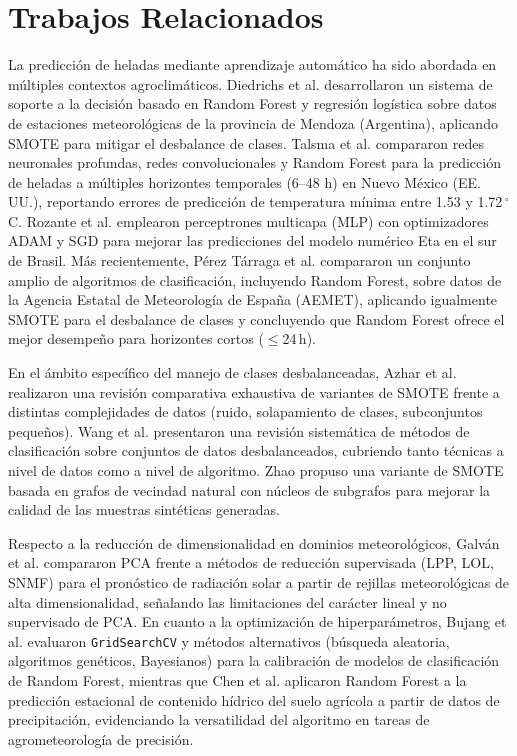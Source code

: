\section{Trabajos Relacionados}\label{sec:relwork}
 
La predicción de heladas mediante aprendizaje automático ha sido abordada en múltiples contextos agroclimáticos. Diedrichs et al. \cite{diedrichs2018} desarrollaron un sistema de soporte a la decisión basado en Random Forest y regresión logística sobre datos de estaciones meteorológicas de la provincia de Mendoza (Argentina), aplicando SMOTE para mitigar el desbalance de clases. Talsma et al. \cite{talsma2023} compararon redes neuronales profundas, redes convolucionales y Random Forest para la predicción de heladas a múltiples horizontes temporales (6--48 h) en Nuevo México (EE.\,UU.), reportando errores de predicción de temperatura mínima entre 1.53 y 1.72\,$^{\circ}$C. Rozante et al. \cite{rozante2023} emplearon perceptrones multicapa (MLP) con optimizadores ADAM y SGD para mejorar las predicciones del modelo numérico Eta en el sur de Brasil. Más recientemente, Pérez Tárraga et al. \cite{perez2025} compararon un conjunto amplio de algoritmos de clasificación, incluyendo Random Forest, sobre datos de la Agencia Estatal de Meteorología de España (AEMET), aplicando igualmente SMOTE para el desbalance de clases y concluyendo que Random Forest ofrece el mejor desempeño para horizontes cortos ($\leq$24\,h).
 
En el ámbito específico del manejo de clases desbalanceadas, Azhar et al. \cite{azhar2023} realizaron una revisión comparativa exhaustiva de variantes de SMOTE frente a distintas complejidades de datos (ruido, solapamiento de clases, subconjuntos pequeños). Wang et al. \cite{wang2021} presentaron una revisión sistemática de métodos de clasificación sobre conjuntos de datos desbalanceados, cubriendo tanto técnicas a nivel de datos como a nivel de algoritmo. Zhao \cite{zhao2024} propuso una variante de SMOTE basada en grafos de vecindad natural con núcleos de subgrafos para mejorar la calidad de las muestras sintéticas generadas.
 
Respecto a la reducción de dimensionalidad en dominios meteorológicos, Galván et al. \cite{galvan2022} compararon PCA frente a métodos de reducción supervisada (LPP, LOL, SNMF) para el pronóstico de radiación solar a partir de rejillas meteorológicas de alta dimensionalidad, señalando las limitaciones del carácter lineal y no supervisado de PCA. En cuanto a la optimización de hiperparámetros, Bujang et al. \cite{bujang2021} evaluaron \texttt{GridSearchCV} y métodos alternativos (búsqueda aleatoria, algoritmos genéticos, Bayesianos) para la calibración de modelos de clasificación de Random Forest, mientras que Chen et al. \cite{chen2024soil} aplicaron Random Forest a la predicción estacional de contenido hídrico del suelo agrícola a partir de datos de precipitación, evidenciando la versatilidad del algoritmo en tareas de agrometeorología de precisión.
 

